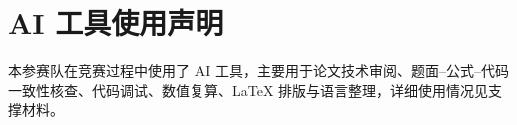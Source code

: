 \section*{AI 工具使用声明}
本参赛队在竞赛过程中使用了 AI 工具，主要用于论文技术审阅、题面--公式--代码一致性核查、代码调试、数值复算、LaTeX 排版与语言整理，详细使用情况见支撑材料。
